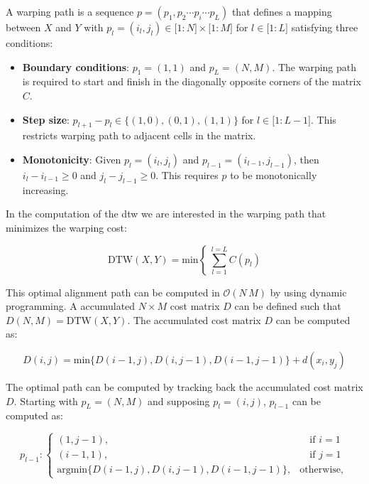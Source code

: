 A warping path is a sequence $p = (p_1, p_2 \cdots p_i \cdots p_L)$ that defines a mapping between $X$ and $Y$ with $p_l = (i_l, j_l) \in \lbrack 1:N\rbrack \times \lbrack1:M\rbrack$ for $ l \in \lbrack1:L\rbrack$ satisfying three conditions:

\begin{itemize}
	\item \textbf{Boundary conditions}: $p_1 = (1, 1)$ and $p_L = (N, M)$. The warping path is required to start and finish in the diagonally opposite corners of the matrix $C$.
	\item \textbf{Step size}: $p_{l+1}-p_l \in \lbrace (1,0), (0,1), (1,1) \rbrace$ for $l \in \lbrack 1: L-1 \rbrack$. This restricts warping path to adjacent cells in the matrix.
	\item \textbf{Monotonicity}: Given $p_l = (i_l, j_l)$ and $p_{l-1} = (i_{l-1}, j_{l-1})$, then $i_l - i_{l-1} \geq 0$ and $j_l - j_{l-1} \geq 0$. This requires $p$ to be monotonically increasing.
\end{itemize}

In the computation of the \gls{dtw} we are interested in the warping path that minimizes the warping cost:

\begin{equation}
\mathrm{DTW}(X,Y) = \mathrm{min} \left\lbrace ~\sum_{l=1}^{l=L}C(p_l)\right.
\end{equation}

This optimal alignment path can be computed in $\mathcal{O}(N\,M)$ by using dynamic programming. A accumulated  $N \times M$ cost matrix $D$ can be defined such that $D(N,M) = \mathrm{DTW}(X,Y)$. The accumulated cost matrix $D$ can be computed as:

\begin{equation}
\label{eq:dtw_classic_cost_matrix_computation}
	D(i,j) = \mathrm{min} \lbrace D(i-1,j), D(i,j-1), D(i-1,j-1)\rbrace + d(x_i, y_j)
\end{equation}

The optimal path can be computed by tracking back the accumulated cost matrix $D$. Starting with $p_L = (N,M)$ and supposing $p_l = (i,j)$, $p_{l-1}$ can be computed as:

\begin{equation}
	p_{l-1} : \begin{cases}
	(1, j-1), & \quad \text{if } i=1\\
	(i-1, 1), & \quad \text{if } j=1\\	
	\mathrm{argmin} \lbrace D(i-1,j), D(i,j-1), D(i-1,j-1)\rbrace, & \mathrm{otherwise},
	\end{cases}
\end{equation}


